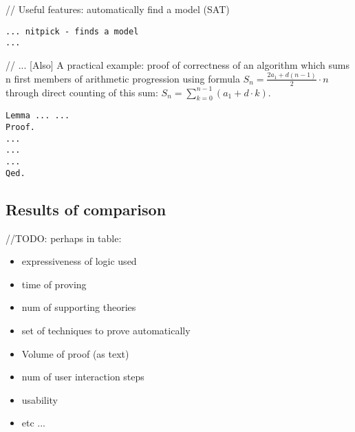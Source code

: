 \documentclass[article]{aaltoseries}
\begin{document}
// Useful features: automatically find a model (SAT)
\begin{lstlisting}[caption={Isabelle as an SAT solver}]
... nitpick - finds a model
...
\end{lstlisting}





// ... [Also] A practical example: proof of correctness of an algorithm which sums n first members of arithmetic progression using formula $S_{n} = { {\frac {2 a_{1} + d (n - 1)}{2} \cdot n}}$ through direct counting of this sum: $S_{n} = \sum\limits_{k=0}^{n-1} (a_{1} + d \cdot k)$.
\begin{lstlisting}[caption={First-order logic proof: formula of the sum of n first members of arithmetic progression}]
Lemma ... ... 
Proof.
...
...
...
Qed.
\end{lstlisting}





\subsection{Results of comparison}
\label{sec:joint_comparison}

//TODO: perhaps in table:
\begin{itemize}
	\itemsep0em
	\item expressiveness of logic used
	\item time of proving
	\item num of supporting theories
	\item set of techniques to prove automatically
	\item Volume of proof (as text)
	\item num of user interaction steps
	\item usability
	\item etc ...
\end{itemize}
\end{document}
